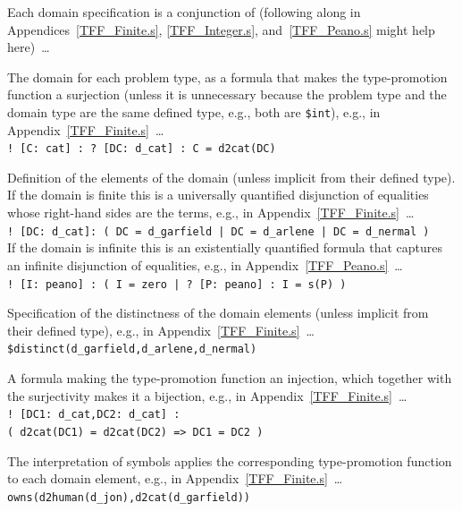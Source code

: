 \documentclass{easychair}
\newcommand{\smalltt}[1]{\small \texttt{#1}}
\newenvironment{packed_itemize}{
\vspace*{-0.3em}
\begin{itemize}
\setlength{\partopsep}{0pt}
\setlength{\itemsep}{1pt}
\setlength{\parskip}{0pt}
\setlength{\parsep}{0pt}
}{\end{itemize}}
\begin{document}
Each domain specification is a conjunction of (following along in Appendices~\ref{TFF_Finite.s}, 
\ref{TFF_Integer.s}, and~\ref{TFF_Peano.s} might help here)~\ldots
\begin{packed_itemize}
\item The domain for each problem type, as a formula that makes the type-promotion function a 
      surjection (unless it is unnecessary because the problem type and the domain type are the
      same defined type, e.g., both are {\tt \$int}), e.g., in Appendix~\ref{TFF_Finite.s}~\ldots\\
      \hspace*{0.5cm}\smalltt{! [C: cat] : ? [DC: d\_cat] : C = d2cat(DC)}
\item Definition of the elements of the domain (unless implicit from their defined type).
      If the domain is finite this is a universally quantified disjunction of equalities whose 
      right-hand sides are the terms, e.g., in Appendix~\ref{TFF_Finite.s}~\ldots\\
      \hspace*{0.5cm}\smalltt{! [DC: d\_cat]: ( DC = d\_garfield | DC = d\_arlene | DC = d\_nermal )}\\
      If the domain is infinite this is an existentially quantified formula that captures an 
      infinite disjunction of equalities, e.g., in Appendix~\ref{TFF_Peano.s}~\ldots\\
      \hspace*{0.5cm}\smalltt{! [I: peano] : ( I = zero | ? [P: peano] : I = s(P) )}
\item Specification of the distinctness of the domain elements (unless implicit from their
      defined type), e.g., in Appendix~\ref{TFF_Finite.s}~\ldots\\
      \hspace*{0.5cm}\smalltt{\$distinct(d\_garfield,d\_arlene,d\_nermal)}
\item A formula making the type-promotion function an injection,
      which together with the surjectivity makes it a bijection, e.g., in 
      Appendix~\ref{TFF_Finite.s}~\ldots\\
      \hspace*{0.5cm}\smalltt{! [DC1: d\_cat,DC2: d\_cat] :}\\
      \hspace*{1.0cm}\smalltt{( d2cat(DC1) = d2cat(DC2) => DC1 = DC2 )}
\end{packed_itemize}
\vspace*{-0.5em}
The interpretation of symbols applies the corresponding type-promotion function to each domain
element, e.g., in Appendix~\ref{TFF_Finite.s}~\ldots\\
\hspace*{0.5cm}\smalltt{owns(d2human(d\_jon),d2cat(d\_garfield))}
\end{document}
